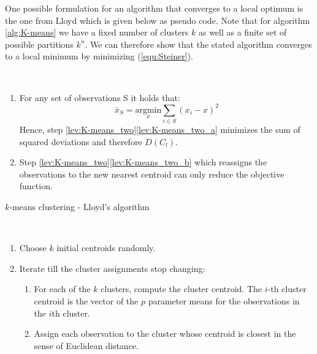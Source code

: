 One possible formulation for an algorithm that converges to a local optimum is the one from Lloyd \cite{lloyd1982least} which is given below as pseudo code. Note that for algorithm \ref{alg:K-means} we have a fixed number of clusters $k$ as well as a finite set of possible partitions $k^n$. We can therefore show that the stated algorithm converges to a local minimum by minimizing (\ref{equ:Steiner}).

\begin{remark}~
	\begin{enumerate}[label=(\roman*)]
		\item For any set of observations S it holds that: 
			\begin{equation*}
				\bar x_S = \underset{x}{\text{argmin}}\sum_{i \in S} (x_i - x)^2
			\end{equation*}
			Hence, step \ref{lev:K-means_two}\ref{lev:K-means_two_a} minimizes the sum of squared deviations and therefore $D(C_l)$.
		\item Step \ref{lev:K-means_two}\ref{lev:K-means_two_b} which reassigns the observations to the new nearest centroid can only reduce the objective function.
	\end{enumerate}
\end{remark}

	
\begin{algorithm}
	\caption{$k$-means clustering \cite{Introducion_Stat_Learning} - Lloyd's algorithm}\label{alg:K-means}
\begin{algorithmic}
\\
	\begin{enumerate}
	\item Choose $k$ initial centroids randomly.
	\item  \label{lev:K-means_two}Iterate till the cluster assignments stop changing:
	\begin{enumerate}[label=\emph{\alph*})]
		\item \label{lev:K-means_two_a} For each of the $k$ clusters, compute the cluster centroid. The \linebreak $i$-th cluster centroid is the vector of the $p$ parameter means for the observations in the $i$th cluster. 
		\item \label{lev:K-means_two_b}Assign each observation to the cluster whose centroid is closest in the sense of Euclidean distance. 
	\end{enumerate}
	\end{enumerate}
\end{algorithmic}
\end{algorithm}

